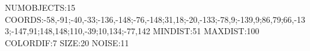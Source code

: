 NUMOBJECTS:15
COORDS:-58,-91;-40,-33;-136,-148;-76,-148;31,18;-20,-133;-78,9;-139,9;86,79;66,-133;-147,91;148,148;110,-39;10,134;-77,142
MINDIST:51
MAXDIST:100
COLORDIF:7
SIZE:20
NOISE:11
